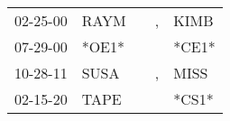\begin{supertabular}{p{0.07\textwidth}p{0.06\textwidth}p{0.02\textwidth}p{0.02\textwidth}p{0.06\textwidth}}
 02-25-00\textsuperscript{} &  RAYM\textsuperscript{} &               &             , &  KIMB\textsuperscript{} \\
 07-29-00\textsuperscript{} &                   *OE1* &               &               &                   *CE1* \\
 10-28-11\textsuperscript{} &  SUSA\textsuperscript{} &               &             , &  MISS\textsuperscript{} \\
 02-15-20\textsuperscript{} &  TAPE\textsuperscript{} &               &               &                   *CS1* \\
\end{supertabular}
